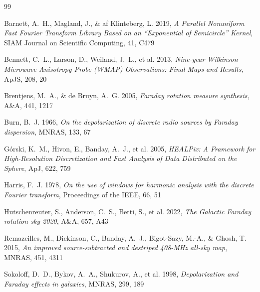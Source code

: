\documentclass[11pt]{article}
\begin{document}
\begin{thebibliography}{99}

Barnett, A.~H., Magland, J., \& af Klinteberg, L. 2019,
\emph{A Parallel Nonuniform Fast Fourier Transform Library Based on an
``Exponential of Semicircle'' Kernel},
SIAM Journal on Scientific Computing, 41, C479

Bennett, C.~L., Larson, D., Weiland, J.~L., et al. 2013,
\emph{Nine-year Wilkinson Microwave Anisotropy Probe (WMAP)
Observations: Final Maps and Results},
ApJS, 208, 20

Brentjens, M.~A., \& de Bruyn, A.~G. 2005,
\emph{Faraday rotation measure synthesis},
A\&A, 441, 1217

Burn, B.~J. 1966,
\emph{On the depolarization of discrete radio sources by Faraday
dispersion},
MNRAS, 133, 67

G\'orski, K.~M., Hivon, E., Banday, A.~J., et al. 2005,
\emph{HEALPix: A Framework for High-Resolution Discretization and Fast
Analysis of Data Distributed on the Sphere},
ApJ, 622, 759

Harris, F.~J. 1978,
\emph{On the use of windows for harmonic analysis with the discrete
Fourier transform},
Proceedings of the IEEE, 66, 51

Hutschenreuter, S., Anderson, C.~S., Betti, S., et al. 2022,
\emph{The Galactic Faraday rotation sky 2020},
A\&A, 657, A43

Remazeilles, M., Dickinson, C., Banday, A.~J., Bigot-Sazy, M.-A., \&
Ghosh, T. 2015,
\emph{An improved source-subtracted and destriped 408-MHz all-sky map},
MNRAS, 451, 4311

Sokoloff, D.~D., Bykov, A.~A., Shukurov, A., et al. 1998,
\emph{Depolarization and Faraday effects in galaxies},
MNRAS, 299, 189

\end{thebibliography}
\end{document}
